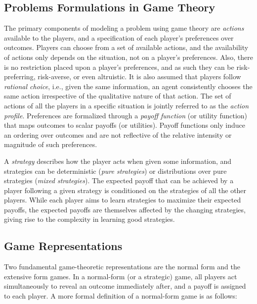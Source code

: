 \subsection{Problems Formulations in Game Theory}
\label{subsec:reps}
The primary components of modeling a problem using game theory are \textit{actions} available to
the players, and a specification of each player's preferences over outcomes.
Players can choose from a set of available actions, and the availability of actions only depends on
the situation, not on a player's preferences.
Also, there is no restriction placed upon a player's preferences, and as such they can be
risk-preferring, risk-averse, or even altruistic.
It is also assumed that players follow \textit{rational choice}, i.e., given the same information,
an agent consistently chooses the same action irrespective of the qualitative nature of that
action.
The set of actions of all the players in a specific situation is jointly referred to as the
\textit{action profile}.
Preferences are formalized through a \textit{payoff function} (or utility function) that maps
outcomes to scalar payoffs (or utilities).
Payoff functions only induce an ordering over outcomes and are not reflective of the relative
intensity or magnitude of such preferences.

A \textit{strategy} describes how the player acts when given some information, and strategies can
be deterministic (\textit{pure strategies}) or distributions over pure strategies (\textit{mixed
	strategies}).
The expected payoff that can be achieved by a player following a given strategy is conditioned on
the strategies of all the other players.
While each player aims to learn strategies to maximize their expected payoffs, the expected payoffs
are themselves affected by the changing strategies, giving rise to the complexity in learning good
strategies.

\subsection{Game Representations}

Two fundamental game-theoretic representations are the normal form and the extensive form games.
In a normal-form (or a strategic) game, all players act simultaneously to reveal an outcome
immediately after, and a payoff is assigned to each player.
A more formal definition of a normal-form game is as follows:

